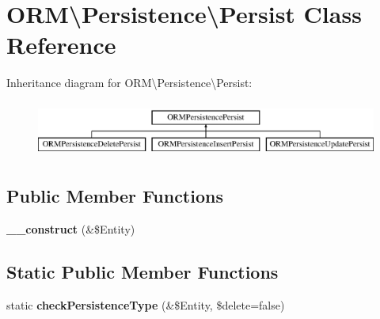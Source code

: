 \hypertarget{classORM_1_1Persistence_1_1Persist}{}\section{O\+RM\textbackslash{}Persistence\textbackslash{}Persist Class Reference}
\label{classORM_1_1Persistence_1_1Persist}
Inheritance diagram for O\+RM\textbackslash{}Persistence\textbackslash{}Persist\+:\begin{figure}[H]
\begin{center}
\leavevmode
\includegraphics[height=1.866667cm]{classORM_1_1Persistence_1_1Persist}
\end{center}
\end{figure}
\subsection*{Public Member Functions}
\begin{DoxyCompactItemize}
\item 
{\bfseries \+\_\+\+\_\+construct} (\&\$Entity)\hypertarget{classORM_1_1Persistence_1_1Persist_a9d8f1baeb95f36d4af14265a34d9c54a}{}\label{classORM_1_1Persistence_1_1Persist_a9d8f1baeb95f36d4af14265a34d9c54a}

\end{DoxyCompactItemize}
\subsection*{Static Public Member Functions}
\begin{DoxyCompactItemize}
\item 
static {\bfseries check\+Persistence\+Type} (\&\$Entity, \$delete=false)\hypertarget{classORM_1_1Persistence_1_1Persist_ab5871bff08c819c24621ad32ed89ef55}{}\label{classORM_1_1Persistence_1_1Persist_ab5871bff08c819c24621ad32ed89ef55}

\end{DoxyCompactItemize}
